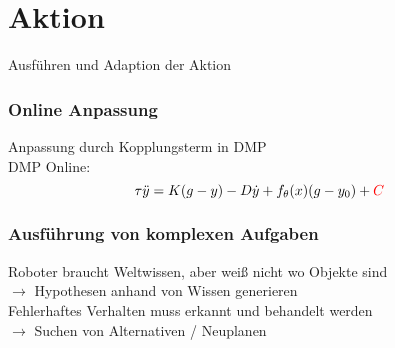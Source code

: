 \section{Aktion}
Ausführen und Adaption der Aktion

\subsubsection{Online Anpassung}
Anpassung durch Kopplungsterm in DMP\\
DMP Online: \[\tau\ddot{y} = K (g-y)-D\dot{y} + f_\theta(x)(g-y_0) + \color{red}C\]

\subsubsection{Ausführung von komplexen Aufgaben}
Roboter braucht Weltwissen, aber weiß nicht wo Objekte sind\\
\(\rightarrow\) Hypothesen anhand von Wissen generieren\\

Fehlerhaftes Verhalten muss erkannt und behandelt werden\\
\(\rightarrow\) Suchen von Alternativen / Neuplanen

